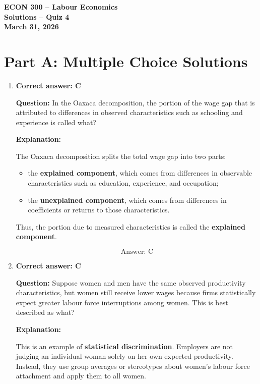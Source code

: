 \documentclass[12pt]{article}
\begin{document}
\begin{center}
\Large \textbf{ECON 300 -- Labour Economics} \vspace{.5cm}\\
\large \textbf{Solutions -- Quiz 4} \vspace{.5cm}\\
\large \textbf{March 31, 2026}
\end{center}


\section*{Part A: Multiple Choice Solutions}

\begin{enumerate}[label=\textbf{\arabic*.}]

\item \textbf{Correct answer: C}

\textbf{Question:} In the Oaxaca decomposition, the portion of the wage gap that is attributed to differences in observed characteristics such as schooling and experience is called what?

\textbf{Explanation:}

The Oaxaca decomposition splits the total wage gap into two parts:

\begin{itemize}
    \item the \textbf{explained component}, which comes from differences in observable characteristics such as education, experience, and occupation;
    \item the \textbf{unexplained component}, which comes from differences in coefficients or returns to those characteristics.
\end{itemize}

Thus, the portion due to measured characteristics is called the \textbf{explained component}.

\[
\boxed{\text{Answer: C}}
\]

\item \textbf{Correct answer: C}

\textbf{Question:} Suppose women and men have the same observed productivity characteristics, but women still receive lower wages because firms statistically expect greater labour force interruptions among women. This is best described as what?

\textbf{Explanation:}

This is an example of \textbf{statistical discrimination}. Employers are not judging an individual woman solely on her own expected productivity. Instead, they use group averages or stereotypes about women's labour force attachment and apply them to all women.


\end{enumerate}
\end{document}
